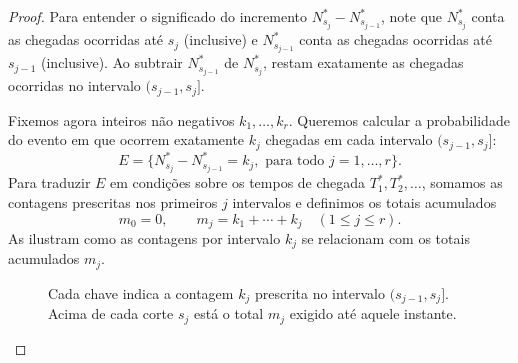 \documentclass[12pt,portuguese]{article}
\theoremstyle{definition}
\theoremstyle{plainexercise}
\theoremstyle{starredexercise}
\theoremstyle{definition}
\begin{document}
\begin{proof}
Para entender o significado do incremento $N_{s_j}^*-N_{s_{j-1}}^*$, note que
$N_{s_j}^*$ conta as chegadas ocorridas até $s_j$ (inclusive) e $N_{s_{j-1}}^*$
conta as chegadas ocorridas até $s_{j-1}$ (inclusive). Ao subtrair
$N_{s_{j-1}}^*$ de $N_{s_j}^*$, restam exatamente as chegadas ocorridas no
intervalo $(s_{j-1},s_j]$.

Fixemos agora inteiros não negativos $k_1,\ldots,k_r$. Queremos calcular a
probabilidade do evento em que ocorrem exatamente $k_j$ chegadas em cada
intervalo $(s_{j-1},s_j]$:
\[
  E=\bigl\{N_{s_j}^*-N_{s_{j-1}}^*=k_j, \text{ para todo } j=1,\ldots,r\bigr\}.
\]
Para traduzir $E$ em condições sobre os tempos de chegada $T_1^*,T_2^*,\ldots$,
somamos as contagens prescritas nos primeiros $j$ intervalos e definimos os
totais acumulados
\[
  m_0=0,\qquad m_j=k_1+\cdots+k_j \quad (1\leqslant j\leqslant r).
\]
As 
ilustram como as contagens por intervalo $k_j$ se relacionam com os totais
acumulados $m_j$.

\begin{figure}[H]
  \centering
  \caption{Cada chave indica a contagem $k_j$ prescrita no intervalo
    $(s_{j-1},s_j]$. Acima de cada corte $s_j$ está o total $m_j$ exigido
    até aquele instante.}
  \label{fig:contagens-prescritas-particao}
\end{figure}


\end{proof}
\end{document}
